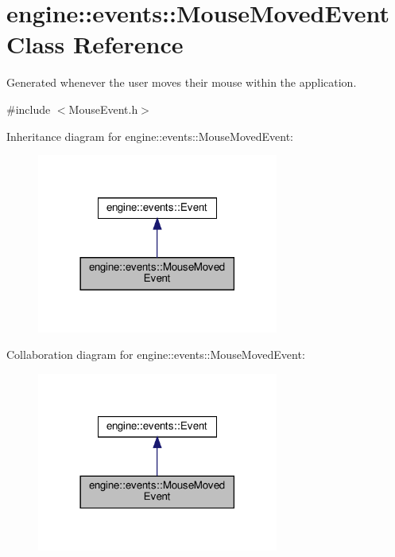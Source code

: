\hypertarget{classengine_1_1events_1_1MouseMovedEvent}{}\section{engine\+:\+:events\+:\+:Mouse\+Moved\+Event Class Reference}
\label{classengine_1_1events_1_1MouseMovedEvent}


Generated whenever the user moves their mouse within the application.  




{\ttfamily \#include $<$Mouse\+Event.\+h$>$}



Inheritance diagram for engine\+:\+:events\+:\+:Mouse\+Moved\+Event\+:\nopagebreak
\begin{figure}[H]
\begin{center}
\leavevmode
\includegraphics[width=225pt]{classengine_1_1events_1_1MouseMovedEvent__inherit__graph}
\end{center}
\end{figure}


Collaboration diagram for engine\+:\+:events\+:\+:Mouse\+Moved\+Event\+:\nopagebreak
\begin{figure}[H]
\begin{center}
\leavevmode
\includegraphics[width=225pt]{classengine_1_1events_1_1MouseMovedEvent__coll__graph}
\end{center}
\end{figure}
